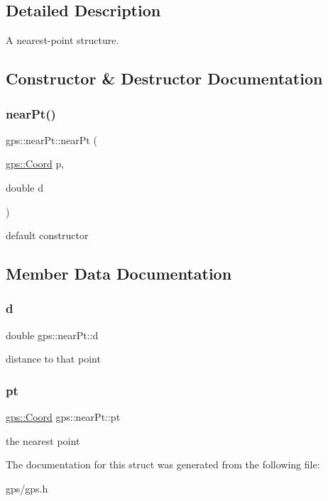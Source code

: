 \subsection{Detailed Description}
A nearest-\/point structure. 

\subsection{Constructor \& Destructor Documentation}
\mbox{\label{structgps_1_1nearPt_a2a719f92056ca65f9cb7047970e2cf47}} 
\subsubsection{\texorpdfstring{near\+Pt()}{nearPt()}}
{\footnotesize\ttfamily gps\+::near\+Pt\+::near\+Pt (\begin{DoxyParamCaption}\item[{\hyperlink{classgps_1_1Coord}{gps\+::\+Coord}}]{p,  }\item[{double}]{d }\end{DoxyParamCaption})\hspace{0.3cm}{\ttfamily [inline]}}

default constructor 

\subsection{Member Data Documentation}
\mbox{\label{structgps_1_1nearPt_a82eeb1e4d61f5df14e20565b2f6da32e}} 
\subsubsection{\texorpdfstring{d}{d}}
{\footnotesize\ttfamily double gps\+::near\+Pt\+::d}

distance to that point \mbox{\label{structgps_1_1nearPt_ab6d2b7e5d5e67891cd83bf2d5ae3ecb9}} 
\subsubsection{\texorpdfstring{pt}{pt}}
{\footnotesize\ttfamily \hyperlink{classgps_1_1Coord}{gps\+::\+Coord} gps\+::near\+Pt\+::pt}

the nearest point 

The documentation for this struct was generated from the following file\+:\begin{DoxyCompactItemize}
\item 
gps/gps.\+h\end{DoxyCompactItemize}
